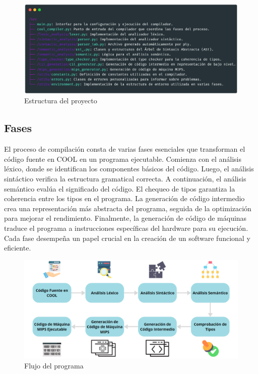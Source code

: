 \documentclass[10pt]{article} %
\begin{document}
	\begin{figure}[H]
		\centering
		\includegraphics[width=15cm]{structure}
		\caption{Estructura del proyecto}
	\end{figure}

	\subsection{Fases}
	
	El proceso de compilación consta de varias fases esenciales que transforman el código fuente en COOL en un programa ejecutable. Comienza con el análisis léxico, donde se identifican los componentes básicos del código. Luego, el análisis sintáctico verifica la estructura gramatical correcta. A continuación, el análisis semántico evalúa el significado del código. El chequeo de tipos garantiza la coherencia entre los tipos en el programa. La generación de código intermedio crea una representación más abstracta del programa, seguida de la optimización para mejorar el rendimiento. Finalmente, la generación de código de máquinas traduce el programa a instrucciones específicas del hardware para su ejecución. Cada fase desempeña un papel crucial en la creación de un software funcional y eficiente.
	
	\begin{figure}[H]
		\centering
		\includegraphics[width=13.5cm]{flow}
		\caption{Flujo del programa}
	\end{figure}
	
\end{document}
